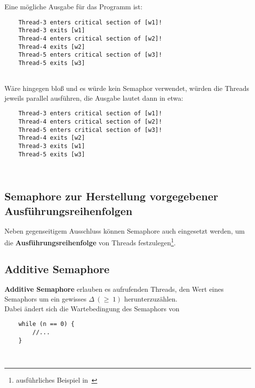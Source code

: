 \newpage
Eine mögliche Ausgabe für das Programm ist:\\

\noindent
\begin{verbatim}
    Thread-3 enters critical section of [w1]!
    Thread-3 exits [w1]
    Thread-4 enters critical section of [w2]!
    Thread-4 exits [w2]
    Thread-5 enters critical section of [w3]!
    Thread-5 exits [w3]
\end{verbatim}\\

\noindent
Wäre  hingegen bloß  und es würde kein Semaphor verwendet, würden die Threads jeweils parallel  ausführen, die Ausgabe lautet dann in etwa:


\begin{verbatim}
    Thread-3 enters critical section of [w1]!
    Thread-4 enters critical section of [w2]!
    Thread-5 enters critical section of [w3]!
    Thread-4 exits [w2]
    Thread-3 exits [w1]
    Thread-5 exits [w3]
\end{verbatim}\\

\subsection{Semaphore zur Herstellung vorgegebener Ausführungsreihenfolgen}

Neben gegenseitigem Ausschluss können Semaphore auch eingesetzt werden, um die \textbf{Ausführungsreihenfolge} von Threads festzulegen\footnote{ausführliches Beispiel in~\cite[104]{Oec22}}.

\subsection{Additive Semaphore}
\textbf{Additive Semaphore} erlauben es aufrufenden Threads, den Wert eines Semaphors um ein gewisses $\Delta\ (\geq\ 1)$ herunterzuzählen.\\

\noindent
Dabei ändert sich die Wartebedingung des Semaphors von

\begin{verbatim}
    while (n == 0) {
        //...
    }
\end{verbatim}\\

